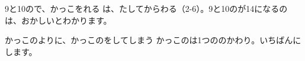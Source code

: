 \begin{tsumazuki}{9と10ので、かっこをれる}
は、たしてからわる（2-6）。9と10のが14になるのは、おかしいとわかります。
\end{tsumazuki}

\begin{tsumazuki}{かっこのよりに、かっこのをしてしまう}
かっこのは1つののかわり。いちばんにします。
\end{tsumazuki}



